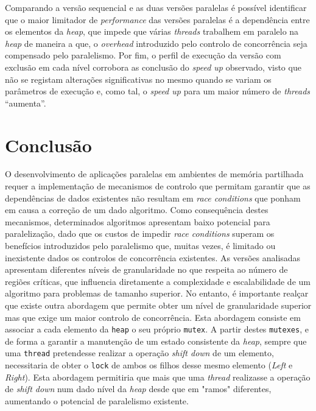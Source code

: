 \documentclass{article}
\begin{document}
Comparando a versão sequencial e as duas versões paralelas é possível identificar que o maior limitador de \textit{performance} das versões paralelas é a 
dependência entre os elementos da \textit{heap}, que impede que várias \textit{threads} trabalhem em paralelo na \textit{heap} de maneira a que, o \textit{overhead} 
introduzido pelo controlo de concorrência seja compensado pelo paralelismo.
Por fim, o perfil de execução da versão com exclusão em cada nível corrobora as conclusão do \textit{speed up} observado, visto que não se 
registam alterações significativas no mesmo quando se variam os parâmetros de execução e, como tal, o \textit{speed up} para um maior número de 
\textit{threads} ``aumenta''.

\section{Conclusão}
O desenvolvimento de aplicações paralelas em ambientes de memória partilhada requer a implementação de mecanismos de controlo que permitam 
garantir que as dependências de dados existentes não resultam em \textit{race conditions} que ponham em causa a correção de um dado algoritmo.
Como consequência destes mecanismos, determinados algoritmos apresentam baixo potencial para paralelização, dado que os custos de 
impedir \textit{race conditions} superam os benefícios introduzidos pelo paralelismo que, muitas vezes, é limitado ou inexistente dados os 
controlos de concorrência existentes.
As versões analisadas apresentam diferentes níveis de granularidade no que respeita ao número de regiões críticas, que influencia diretamente a
complexidade e escalabilidade de um algoritmo para problemas de tamanho superior. No entanto, é importante realçar que existe outra abordagem 
que permite obter um nível de granularidade superior mas que exige um maior controlo de concorrência. Esta abordagem consiste em associar a
cada elemento da \texttt{heap} o seu próprio \texttt{mutex}. A partir destes \texttt{mutexes}, e de forma a garantir a manutenção de um estado 
consistente da \textit{heap}, sempre que uma \texttt{thread} pretendesse realizar a operação \textit{shift down} de um elemento, necessitaria 
de obter o \texttt{lock} de ambos os filhos desse mesmo elemento (\textit{Left} e \textit{Right}). Esta abordagem permitiria que mais que uma 
\textit{thread} realizasse a operação de \textit{shift down} num dado nível da \textit{heap} desde que em "ramos" diferentes, aumentando o 
potencial de paralelismo existente. 
\end{document}
